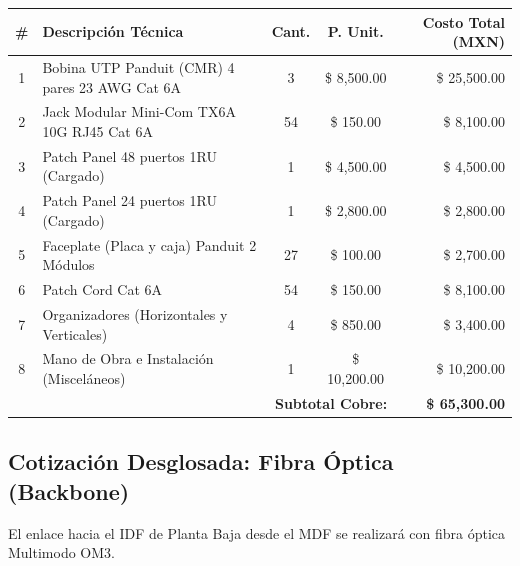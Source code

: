 \documentclass[11pt, letterpaper]{article}
\begin{document}
\begin{table}[h]
\centering
{} %
\renewcommand{\arraystretch}{1.3}
\begin{tabularx}{\textwidth}{@{} c X c c r @{}}
\toprule
\rowcolor{AzulUNAM!10} %
\textbf{\#} & \textbf{Descripción Técnica} & \textbf{Cant.} & \textbf{P. Unit.} & \textbf{Costo Total (MXN)} \\ \midrule
1 & Bobina UTP Panduit (CMR) 4 pares 23 AWG Cat 6A & 3 & \$ 8,500.00 & \$ 25,500.00 \\
2 & Jack Modular Mini-Com TX6A 10G RJ45 Cat 6A & 54 & \$ 150.00 & \$ 8,100.00 \\
3 & Patch Panel 48 puertos 1RU (Cargado) & 1 & \$ 4,500.00 & \$ 4,500.00 \\
4 & Patch Panel 24 puertos 1RU (Cargado) & 1 & \$ 2,800.00 & \$ 2,800.00 \\
5 & Faceplate (Placa y caja) Panduit 2 Módulos & 27 & \$ 100.00 & \$ 2,700.00 \\
6 & Patch Cord Cat 6A & 54 & \$ 150.00 & \$ 8,100.00 \\
7 & Organizadores (Horizontales y Verticales) & 4 & \$ 850.00 & \$ 3,400.00 \\
8 & Mano de Obra e Instalación (Misceláneos) & 1 & \$ 10,200.00 & \$ 10,200.00 \\ \midrule
\multicolumn{4}{r}{\textbf{Subtotal Cobre:}} & \textbf{\textcolor{AzulUNAM}{\$ 65,300.00}} \\
\bottomrule
\end{tabularx}
\end{table}

\subsection{Cotización Desglosada: Fibra Óptica (Backbone)}
El enlace hacia el IDF de Planta Baja desde el MDF se realizará con fibra óptica Multimodo OM3.
\end{document}
